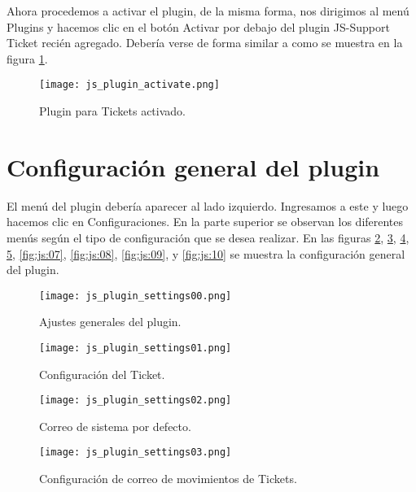 Ahora procedemos a activar  el  plugin, de la misma  forma, nos dirigimos al menú Plugins y hacemos clic en el botón Activar por debajo del plugin JS-Support Ticket recién agregado. Debería verse de forma similar a como se muestra en la figura \ref{fig:js:02}.
\begin{figure}[H]
\centering
\texttt{[image: js\_plugin\_activate.png]}
\caption{Plugin para Tickets activado.}
\label{fig:js:02}
\end{figure}
\section{Configuración general del plugin}
El menú del plugin debería aparecer al lado izquierdo. Ingresamos a este y luego hacemos clic en Configuraciones. En la parte superior se observan los diferentes menús según el tipo de configuración que se desea realizar. En las figuras \ref{fig:js:03}, \ref{fig:js:04}, \ref{fig:js:05}, \ref{fig:js:06}, \ref{fig:js:07}, \ref{fig:js:08}, \ref{fig:js:09}, y \ref{fig:js:10} se muestra la configuración general del plugin.
\begin{figure}[H]
\centering
\texttt{[image: js\_plugin\_settings00.png]}
\caption{Ajustes generales del plugin.}
\label{fig:js:03}
\end{figure}
\begin{figure}[H]
\centering
\texttt{[image: js\_plugin\_settings01.png]}
\caption{Configuración del Ticket.}
\label{fig:js:04}
\end{figure}
\begin{figure}[H]
\centering
\texttt{[image: js\_plugin\_settings02.png]}
\caption{Correo de sistema por defecto.}
\label{fig:js:05}
\end{figure}
\begin{figure}[H]
\centering
\texttt{[image: js\_plugin\_settings03.png]}
\caption{Configuración de correo de movimientos de Tickets.}
\label{fig:js:06}
\end{figure}
